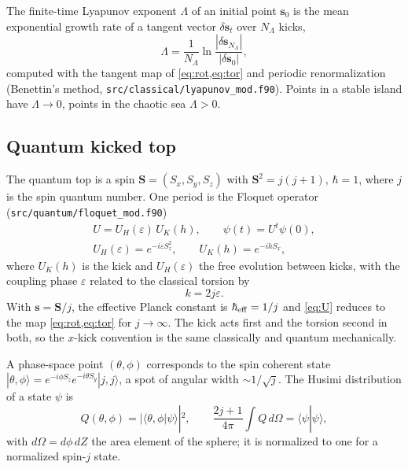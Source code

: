 \documentclass[aps,pra,twocolumn,superscriptaddress,nofootinbib]{revtex4-2}
\begin{document}
The finite-time Lyapunov exponent $\Lambda$ of an initial point $\bm s_0$ is the mean exponential growth rate of a
tangent vector $\delta\bm s_t$ over $N_\Lambda$ kicks,
\begin{equation}\label{eq:lyap}
  \Lambda = \frac{1}{N_\Lambda}\ln\frac{|\delta\bm s_{N_\Lambda}|}{|\delta\bm s_0|},
\end{equation}
computed with the tangent map of \cref{eq:rot,eq:tor} and periodic renormalization (Benettin's method,
\texttt{src/classical/lyapunov\_mod.f90}). Points in a stable island have $\Lambda\to0$, points in the chaotic sea
$\Lambda>0$.

\subsection{Quantum kicked top}\label{sec:quantum}

The quantum top is a spin $\bm S=(S_x,S_y,S_z)$ with $\bm S^2=j(j+1)$, $\hbar=1$, where $j$ is the spin quantum
number. One period is the Floquet operator (\texttt{src/quantum/floquet\_mod.f90})
\begin{equation}\label{eq:U}
  \begin{gathered}
  U = U_H(\varepsilon)\,U_K(h),\qquad \psi(t) = U^t\psi(0),\\
  U_H(\varepsilon)=e^{-i\varepsilon S_z^2},\qquad U_K(h)=e^{-ihS_x},
  \end{gathered}
\end{equation}
where $U_K(h)$ is the kick and $U_H(\varepsilon)$ the free evolution between kicks, with the coupling phase
$\varepsilon$ related to the classical torsion by
\begin{equation}\label{eq:eps}
  k = 2j\varepsilon .
\end{equation}
With $\bm s=\bm S/j$, the effective Planck constant is $\hbar_{\rm eff}=1/j$ and \cref{eq:U} reduces to the map
\cref{eq:rot,eq:tor} for $j\to\infty$. The kick acts first and the torsion second in both, so the $x$-kick convention
is the same classically and quantum mechanically.

A phase-space point $(\theta,\phi)$ corresponds to the spin coherent state
$|\theta,\phi\rangle = e^{-i\phi S_z}e^{-i\theta S_y}|j,j\rangle$, a spot of angular width $\sim1/\sqrt j$. The
Husimi distribution of a state $\psi$ is
\begin{equation}\label{eq:Q}
  Q(\theta,\phi) = |\langle\theta,\phi|\psi\rangle|^2,\qquad
  \frac{2j+1}{4\pi}\int Q\,d\Omega = \langle\psi|\psi\rangle ,
\end{equation}
with $d\Omega = d\phi\,dZ$ the area element of the sphere; it is normalized to one for a normalized spin-$j$ state.
\end{document}
